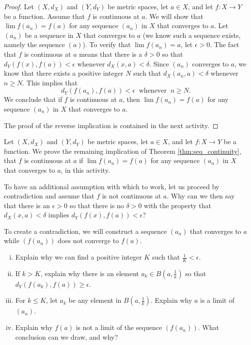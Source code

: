 \begin{proof} Let $(X,d_X)$ and $(Y,d_Y)$ be metric spaces, let $a \in X$, and let $f: X \to Y$ be a function. Assume that $f$ is continuous at $a$. We will show that $\lim f(a_n) = f(a)$ for any sequence $(a_n)$ in $X$ that converges to $a$. Let $(a_n)$ be a sequence in $X$ that converges to $a$ (we know such a sequence exists, namely the sequence $(a)$). To verify that $\lim f(a_n) = a$, let $\epsilon > 0$. The fact that $f$ is continuous at $a$ means that there is a $\delta > 0$ so that $d_Y(f(x), f(a)) < \epsilon$ whenever $d_X(x,a) < \delta$. Since $(a_n)$ converges to $a$, we know that there exists a positive integer $N$ such that $d_X(a_n, a) < \delta$ whenever $n \geq N$. This implies that 
\[d_Y(f(a_n), f(a)) < \epsilon \ \text{ whenever } \ n \geq N.\]
We conclude that if $f$ is continuous at $a$, then $\lim f(a_n) = f(a)$ for any sequence $(a_n)$ in $X$ that converges to $a$.

The proof of the reverse implication is contained in the next activity.
\end{proof}


\begin{activity} Let $(X,d_X)$ and $(Y,d_Y)$ be metric spaces, let $a \in X$, and let $f: X \to Y$ be a function. We prove the remaining implication of Theorem \ref{thm:seq_continuity}, that $f$ is continuous at $a$ if $\lim f(a_n) = f(a)$ for any sequence $(a_n)$ in $X$ that converges to $a$, in this activity. 
\ba
\item To have an additional assumption with which to work, let us proceed by contradiction and assume that $f$ is not continuous at $a$. Why can we then say that there is an $\epsilon > 0$ so that there is no $\delta > 0$ with the property that $d_X(x,a) < \delta$ implies $d_Y(f(x), f(a)) < \epsilon$?

\item To create a contradiction, we will construct a sequence $(a_n)$ that converges to $a$ while $(f(a_n))$ does not converge to $f(a)$. 
	\begin{enumerate}[i.]
	\item Explain why we can find a positive integer $K$ such that $\frac{1}{K} < \epsilon$.
	
	\item If $k > K$, explain why there is an element $a_k \in B\left(a, \frac{1}{k}\right)$ so that $d_Y(f(a_k), f(a)) \geq \epsilon$.

\item For $k \leq K$, let $a_k$ be any element in $B\left(a, \frac{1}{k}\right)$. Explain why $a$ is a limit of $(a_n)$. 

\item Explain why $f(a)$ is not a limit of the sequence $(f(a_n))$. What conclusion can we draw, and why? 

	\end{enumerate}
\ea

\end{activity}

